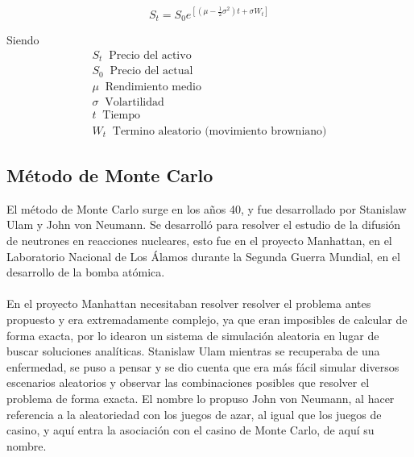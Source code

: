 \documentclass[12pt,a4paper]{article}
\begin{document}
\begin{equation}
\boxed{S_{t} = S_{0} e^{\left[\left(\mu - \frac{1}{2}\sigma^2\right)t + \sigma W_{t}\right]}}
\end{equation}

Siendo 
\begin{equation*}
\begin{matrix}
 S_{t} \;\; \textrm{Precio del activo} \;\;\;\;\;\;\;\;\;\;\;\;\;\;\;\;\;\;\;\;\;\;\;\;\;\;\;\;\;\;\;\;\;\;\;\;\;\;\;\; \\
S_{0} \;\; \textrm{Precio del actual} \;\;\;\;\;\;\;\;\;\;\;\;\;\;\;\;\;\;\;\;\;\;\;\;\;\;\;\;\;\;\;\;\;\;\;\;\;\;\;\; \\
 \mu \;\; \textrm{Rendimiento medio} \;\;\;\;\;\;\;\;\;\;\;\;\;\;\;\;\;\;\;\;\;\;\;\;\;\;\;\;\;\;\;\;\;\;\;\;\;\\
 \sigma \;\; \textrm{Volartilidad} \;\;\;\;\;\;\;\;\;\;\;\;\;\;\;\;\;\;\;\;\;\;\;\;\;\;\;\;\;\;\;\;\;\;\;\;\;\;\;\;\;\;\;\;\;\;\;\;\;\\
 t \;\; \textrm{Tiempo} \;\;\;\;\;\;\;\;\;\;\;\;\;\;\;\;\;\;\;\;\;\;\;\;\;\;\;\;\;\;\;\;\;\;\;\;\;\;\;\;\;\;\;\;\;\;\;\;\;\;\;\;\;\;\;\; \\
 W_{t} \;\; \textrm{Termino aleatorio (movimiento browniano)}
\end{matrix}
\end{equation*}


\subsection{Método de Monte Carlo}

El método de Monte Carlo \cite{vega2012metodo} surge en los años 40, y fue desarrollado por Stanislaw Ulam y John von Neumann. Se desarrolló para resolver el estudio de la difusión de neutrones en reacciones nucleares, esto fue en el proyecto Manhattan, en el Laboratorio Nacional de Los Álamos durante la Segunda Guerra Mundial, en el desarrollo de la bomba atómica. \\ \\

En el proyecto Manhattan necesitaban resolver resolver el problema antes propuesto y era extremadamente complejo, ya que eran imposibles de calcular de forma exacta, por lo idearon un sistema de simulación aleatoria en lugar de buscar soluciones analíticas. Stanislaw Ulam mientras se recuperaba de una enfermedad, se puso a pensar y se dio cuenta que era más fácil simular diversos escenarios aleatorios y observar las combinaciones posibles que resolver el problema de forma exacta. El nombre lo propuso John von Neumann, al hacer referencia a la aleatoriedad con los juegos de azar, al igual que los juegos de casino, y aquí entra la asociación con el casino de Monte Carlo, de aquí su nombre. \\ \\
\end{document}
